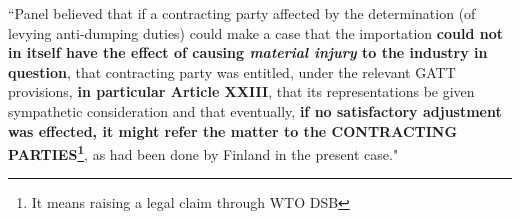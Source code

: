 \begin{displayquote}[]
    ``Panel believed that if a contracting party
    affected by the determination (of levying anti-dumping duties) could make a case that the importation \textbf{could not in itself have the effect of
    causing \textit{material injury} to the industry in question}, that contracting party was entitled, under the relevant
    GATT provisions, \textbf{in particular Article XXIII}, that its representations be given sympathetic consideration
    and that eventually, \textbf{if no satisfactory adjustment was effected, it might refer the matter to the CONTRACTING
    PARTIES\footnote{It means raising a legal claim through WTO DSB}}, as had been done by Finland in the present case."
\end{displayquote}

 













